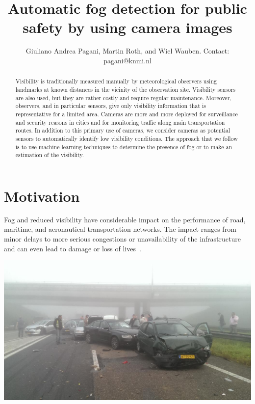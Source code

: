 \documentclass{article}
\title{Automatic fog detection for public safety by using camera images}
\author{Giuliano Andrea Pagani\affil{1}, Martin Roth\affil{1}, and Wiel Wauben\affil{1}. Contact: pagani@knmi.nl}
\begin{document}
\maketitle

\begin{abstract}
\begin{multicols}{2}
Visibility is traditionally measured manually by meteorological observers using landmarks at known distances in
the vicinity of the observation site. 
Visibility sensors are also used, but they are rather costly and
require regular maintenance. Moreover, observers, and in particular sensors, give only visibility information that is
representative for a limited area. 
Cameras are more and more deployed for surveillance and security reasons in cities and for monitoring traffic along
main transportation routes. In addition to this primary use of cameras, we consider cameras as potential sensors to
automatically identify low visibility conditions. 
The approach that we follow is to use machine learning techniques
to determine the presence of fog or to make an estimation of the visibility. 
\end{multicols}
\end{abstract}

\bcols %

\section*{Motivation}
Fog and reduced visibility have considerable impact on the performance of road, maritime, and aeronautical transportation
networks. The impact ranges from minor delays to more serious congestions or unavailability of the
infrastructure and can even lead to damage or loss of lives~\cite{gultepe2007fog}.

\begin{minipage}[b]{\columnwidth}
	\begin{center}
	\includegraphics[width=0.9\columnwidth]{Accident.jpeg}
	\label{figAccident}
	\end{center}
\end{minipage}
\vspace{-2cm}
\end{document}
